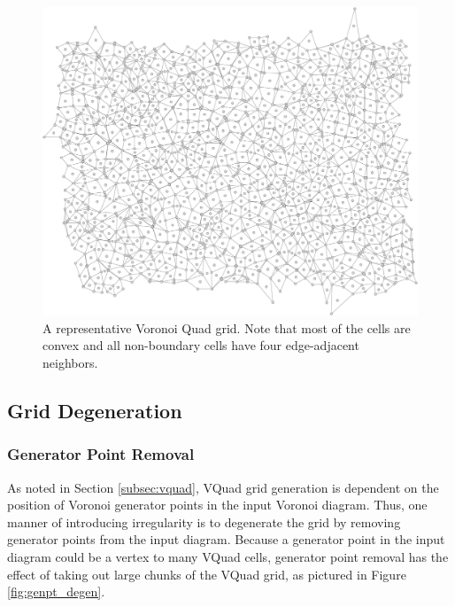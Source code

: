 \documentclass[a4paper,11pt]{article}
\begin{document}
\begin{figure}[htp]
\centering
\includegraphics[width=1.0\textwidth]{ch3_figs/vquad_stoma_v2}
\caption[Voronoi Quad Grid]{
  A representative Voronoi Quad grid. Note that most of the cells are convex and all non-boundary cells have four  edge-adjacent neighbors.
}
\label{fig:vquad_grid}
\end{figure}

\subsection{Grid Degeneration}

\subsubsection{Generator Point Removal}
\label{subsec:gen_pt_rem}
As noted in Section \ref{subsec:vquad}, VQuad grid generation is dependent on the position of Voronoi generator points in the input Voronoi diagram. Thus, one manner of introducing irregularity is to degenerate the grid by removing generator points from the input diagram. Because a generator point in the input diagram could be a vertex to many VQuad cells, generator point removal has the effect of taking out large chunks of the VQuad grid, as pictured in Figure \ref{fig:genpt_degen}.
\end{document}
